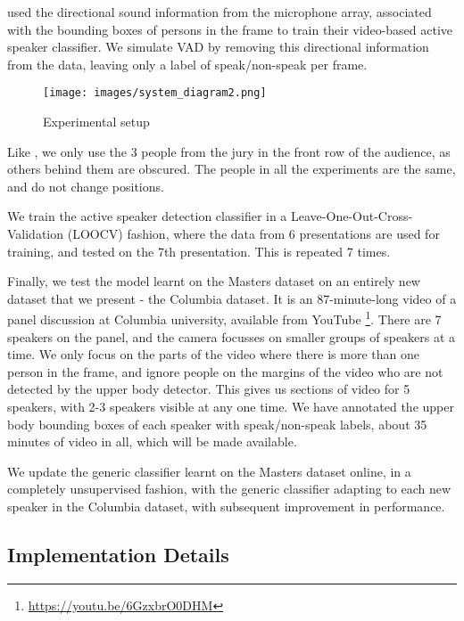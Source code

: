 \documentclass[runningheads]{llncs}
\begin{document}
\cite{Chakravarty15} used the directional sound information from the microphone array, associated with the bounding boxes of persons in the frame to train their video-based active speaker classifier. We simulate VAD by removing this directional information from the data, leaving only a label of speak/non-speak per frame.

\begin{figure}[t]
\begin{center}
    \texttt{[image: images/system\_diagram2.png]} 
\end{center}
 \vspace*{-0.6cm} 
   \caption{Experimental setup}
\label{fig:systemDiagram}
 \vspace*{-0.6cm} 
\end{figure}

Like \cite{Chakravarty15}, we only use the 3 people from the jury in the front row of the audience, as others behind them are obscured. The people in all the experiments are the same, and do not change positions. 

We train the active speaker detection classifier in a Leave-One-Out-Cross-Validation (LOOCV) fashion, where the data from 6 presentations are used for training, and tested on the 7th presentation. This is repeated 7 times. 

Finally, we test the model learnt on the Masters dataset on an entirely new dataset that we present - the Columbia dataset. It is an 87-minute-long video of a panel discussion at Columbia university, available from YouTube \footnote{\url{https://youtu.be/6GzxbrO0DHM}}. There are 7 speakers on the panel, and the camera focusses on smaller groups of speakers at a time. We only focus on the parts of the video where there is more than one person in the frame, and ignore people on the margins of the video who are not detected by the upper body detector. This gives us sections of video for 5 speakers, with 2-3 speakers visible at any one time. We have annotated the upper body bounding boxes of each speaker with speak/non-speak labels, about 35 minutes of video in all, which will be made available. 

We update the generic classifier learnt on the Masters dataset online, in a completely unsupervised fashion, with the generic classifier adapting to each new speaker in the Columbia dataset, with subsequent improvement in performance.

\subsection{Implementation Details}
\end{document}
